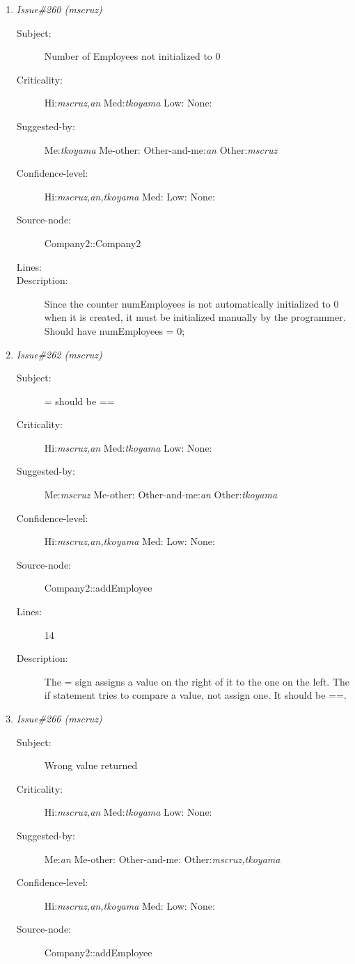 \begin{enumerate}
\begin{description}
\item [Description:] Since the list is  of pointers to Employee
objects, the destructor of this class should be responsible in deallocating
space assigned to each Employee of the list.  Since the destructor was not
declared virtual, the Employee destructor will not be automatcally invoked.
\end{description}
\item {\it Issue\#260 (mscruz)}
\begin{description}
\item [Subject:] Number of Employees not initialized to 0
\item [Criticality:] Hi:{\it mscruz,an} Med:{\it tkoyama} Low:{\it } None:{\it }
\item [Suggested-by:] Me:{\it tkoyama} Me-other:{\it } Other-and-me:{\it an} Other:{\it mscruz}
\item [Confidence-level:] Hi:{\it mscruz,an,tkoyama} Med:{\it } Low:{\it } None:{\it }
\item [Source-node:] Company2::Company2

\item [Lines:] 

\item [Description:] Since the counter numEmployees is not
automatically initialized to 0 when it is created, it must be initialized
manually by the programmer.  Should have numEmployees = 0;
\end{description}
\item {\it Issue\#262 (mscruz)}
\begin{description}
\item [Subject:] = should be ==
\item [Criticality:] Hi:{\it mscruz,an} Med:{\it tkoyama} Low:{\it } None:{\it }
\item [Suggested-by:] Me:{\it mscruz} Me-other:{\it } Other-and-me:{\it an} Other:{\it tkoyama}
\item [Confidence-level:] Hi:{\it mscruz,an,tkoyama} Med:{\it } Low:{\it } None:{\it }
\item [Source-node:] Company2::addEmployee

\item [Lines:] 14

\item [Description:] The = sign assigns a value on the right of it
to the one on the left.  The if statement tries to compare a value, not
assign one.  It should be ==.
\end{description}
\item {\it Issue\#266 (mscruz)}
\begin{description}
\item [Subject:] Wrong value returned
\item [Criticality:] Hi:{\it mscruz,an} Med:{\it tkoyama} Low:{\it } None:{\it }
\item [Suggested-by:] Me:{\it an} Me-other:{\it } Other-and-me:{\it } Other:{\it mscruz,tkoyama}
\item [Confidence-level:] Hi:{\it mscruz,an,tkoyama} Med:{\it } Low:{\it } None:{\it }
\item [Source-node:] Company2::addEmployee


\end{description}
\end{enumerate}
